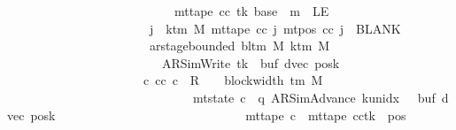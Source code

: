\begin{isabellebody}
\ \ \ \ \ \ \ \ \ \ \ \ \ \ \ \ \ \ \ \ \ \ \ \ \ \ {\isasymLongrightarrow}\ mt{\isacharunderscore}{\kern0pt}tape\ cc\ tk\ {\isacharparenleft}{\kern0pt}base{\isacharprime}{\kern0pt}\ {\isacharplus}{\kern0pt}\ m{\isacharparenright}{\kern0pt}\ {\isasymnoteq}\ LE{}{\isacharsemicolon}{\kern0pt}\isanewline
\ \ \ \ \ \ \ \ \ \ \ \ \ \ \ \ \ \ \ \ \ \ \ {\isasymforall}j\ {\isasymge}\ k{\isacharunderscore}{\kern0pt}tm\ M{\isachardot}{\kern0pt}\ mt{\isacharunderscore}{\kern0pt}tape\ cc\ j\ {\isacharparenleft}{\kern0pt}mt{\isacharunderscore}{\kern0pt}pos\ cc\ j{\isacharparenright}{\kern0pt}\ {\isacharequal}{\kern0pt}\ BLANK{}{\isacharsemicolon}{\kern0pt}\isanewline
\ \ \ \ \ \ \ \ \ \ \ \ \ \ \ \ \ \ \ \ \ \ \ ar{\isacharunderscore}{\kern0pt}stage{\isacharunderscore}{\kern0pt}bounded\ {\isacharparenleft}{\kern0pt}bl{\isacharunderscore}{\kern0pt}tm\ M{\isacharparenright}{\kern0pt}\ {\isacharparenleft}{\kern0pt}k{\isacharunderscore}{\kern0pt}tm\ M{\isacharparenright}{\kern0pt}\isanewline
\ \ \ \ \ \ \ \ \ \ \ \ \ \ \ \ \ \ \ \ \ \ \ \ \ {\isacharparenleft}{\kern0pt}AR{\isacharunderscore}{\kern0pt}SimWrite{\isacharcomma}{\kern0pt}\ tk{\isacharcomma}{\kern0pt}\ {}{\isacharcomma}{\kern0pt}\ buf{\isacharcomma}{\kern0pt}\ dvec{\isacharcomma}{\kern0pt}\ posk{\isacharparenright}{\kern0pt}\ {\isasymrbrakk}\isanewline
\ \ \ \ \ \ \ \ \ \ \ \ \ \ \ \ \ \ \ \ \ {\isasymLongrightarrow}\ {\isasymexists}c{\isacharprime}{\kern0pt}{\isacharprime}{\kern0pt}{\isachardot}{\kern0pt}\ {\isacharparenleft}{\kern0pt}cc{\isacharcomma}{\kern0pt}\ c{\isacharprime}{\kern0pt}{\isacharprime}{\kern0pt}{\isacharparenright}{\kern0pt}\ {\isasymin}\ R{\isacharprime}{\kern0pt}\ {\isacharcircum}{\kern0pt}{\isacharcircum}{\kern0pt}\ {\isacharparenleft}{\kern0pt}{}\ {\isacharasterisk}{\kern0pt}\ block{\isacharunderscore}{\kern0pt}width\ {\isacharparenleft}{\kern0pt}{\isasymGamma}{\isacharunderscore}{\kern0pt}tm\ M{\isacharparenright}{\kern0pt}{\isacharparenright}{\kern0pt}\isanewline
\ \ \ \ \ \ \ \ \ \ \ \ \ \ \ \ \ \ \ \ \ \ \ \ \ \ \ \ \ {\isasymand}\ mt{\isacharunderscore}{\kern0pt}state\ c{\isacharprime}{\kern0pt}{\isacharprime}{\kern0pt}\ {\isacharequal}{\kern0pt}\ {\isacharparenleft}{\kern0pt}q{\isacharcomma}{\kern0pt}\ AR{\isacharunderscore}{\kern0pt}SimAdvance{\isacharcomma}{\kern0pt}\ k{\isacharunderscore}{\kern0pt}unidx\ {}{\isacharcomma}{\kern0pt}\ {}{\isacharcomma}{\kern0pt}\ buf{\isacharcomma}{\kern0pt}\ dvec{\isacharcomma}{\kern0pt}\ posk{\isacharparenright}{\kern0pt}\isanewline
\ \ \ \ \ \ \ \ \ \ \ \ \ \ \ \ \ \ \ \ \ \ \ \ \ \ \ \ \ {\isasymand}\ mt{\isacharunderscore}{\kern0pt}tape\ c{\isacharprime}{\kern0pt}{\isacharprime}{\kern0pt}\ {\isacharequal}{\kern0pt}\ {\isacharparenleft}{\kern0pt}mt{\isacharunderscore}{\kern0pt}tape\ cc{\isacharparenright}{\kern0pt}{\isacharparenleft}{\kern0pt}tk\ {\isacharcolon}{\kern0pt}{\isacharequal}{\kern0pt}\ {\isacharparenleft}{\kern0pt}{\isasymlambda}pos{\isachardot}{\kern0pt}\isanewline

\end{isabellebody}
